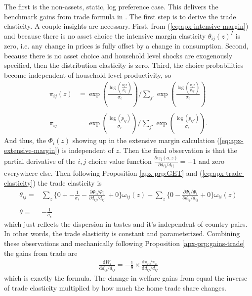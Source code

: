 \documentclass[12pt,pdftex]{article}
\begin{document}
\begin{onehalfspacing}
The first is the non-assets, static, log preference case. This delivers the benchmark gains from trade formula in \citet{arkolakis2012new}. The first step is to derive the trade elasticity. A couple insights are necessary. First, from (\ref{eq:apx-intensive-margin}) and because there is no asset choice the intensive margin elasticity $\theta_{ij}(z)^I$ is zero, i.e. any change in prices is fully offset by a change in consumption. Second, because there is no asset choice and household level shocks are exogenously specified, then the distribution elasticity is zero. Third, the choice probabilities become independent of household level productivity, so
\begin{align} 
\pi_{ij}(z) &= \exp \left( \frac{ \log\left( \frac{w_{i}z}{p_{ij}} \right) }{\sigma_{\epsilon}} \right) \Bigg / \sum_{j'} \exp \left( \frac{  \log\left( \frac{w_{i}z}{p_{ij'}} \right) }{\sigma_{\epsilon}} \right) \\
\nonumber \\
\pi_{ij} &= \exp \left( \frac{ \log\left( p_{ij} \right) }{\sigma_{\epsilon}} \right) \Bigg / \sum_{j'} \exp \left( \frac{  \log\left( p_{ij'} \right) }{\sigma_{\epsilon}} \right).
\end{align}
And thus, the $\Phi_{i}(z)$ showing up in the extensive margin calculation (\ref{eq:apx-extensive-margin}) is independent of $z$.  Then the final observation is that the partial derivative of the $i,j$ choice value function $\frac{\partial v_{ij}(a,z)}{\partial d_{ij}/d_{ij}} = -1$ and zero everywhere else. Then following Proposition \ref{apx-prp:GET} and (\ref{eq:apx-trade-elasticity}) the trade elasticity is
\begin{align}
\nonumber
\theta_{ij} =& \sum_{z} \bigg \{ 0 + -\frac{1}{\sigma_{\epsilon}} - \frac{\partial \Phi_{i} / \Phi_{i}}{\partial d_{ij}/d_{ij}} \ + 0 \bigg \}\omega_{ij}(z) - \sum_{z} \bigg \{  0 - \frac{\partial \Phi_{i} / \Phi_{i}}{\partial d_{ij}/d_{ij}} + 0 \bigg \}\omega_{ii}(z) \\
\nonumber \\
\theta =& -\frac{1}{\sigma_{\epsilon}} \nonumber
\end{align}
which just reflects the dispersion in tastes and it's independent of country pairs. In other words, the trade elasticity is constant and parameterized. Combining these observations and mechanically following Proposition \ref{apx-prp:gains-trade} the gains from trade are
\begin{align}
\frac{\mathrm{d} W_{i}}{\mathrm{d} d_{ij} / d_{ij}} = -\frac{1}{\theta} \times \frac{\mathrm{d} \pi_{ii} / \pi_{ii}}{\mathrm{d}d_{ij} / d_{ij}}
\end{align}
which is exactly the \citet{arkolakis2012new} formula. The change in welfare gains from equal the inverse of trade elasticity multiplied by how much the home trade share changes.


\end{onehalfspacing}
\end{document}
